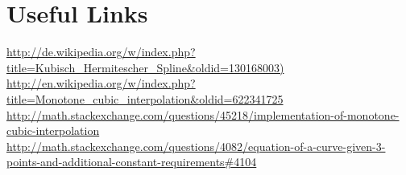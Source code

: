 \documentclass[a4paper]{article}
\begin{document}
\section{Useful Links}

\url{http://de.wikipedia.org/w/index.php?title=Kubisch_Hermitescher_Spline&oldid=130168003)}\\
\url{http://en.wikipedia.org/w/index.php?title=Monotone_cubic_interpolation&oldid=622341725}\\
\url{http://math.stackexchange.com/questions/45218/implementation-of-monotone-cubic-interpolation}\\
\url{http://math.stackexchange.com/questions/4082/equation-of-a-curve-given-3-points-and-additional-constant-requirements#4104}
\end{document}
